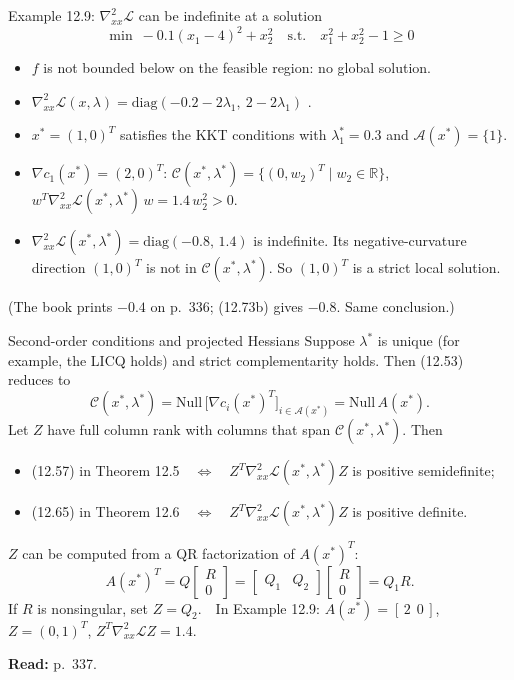 \documentclass[aspectratio=169,12pt]{beamer}
\newcommand{\R}{\mathbb{R}}
\newcommand{\xs}{x^{*}}
\newcommand{\eqn}[1]{\text{\small(#1)}}
\newcommand{\readbook}[1]{{\color{red}\textbf{Read:} #1}}
\newcommand{\ls}{\lambda^{*}}
\newcommand{\cA}{\mathcal{A}}
\newcommand{\cC}{\mathcal{C}}
\newcommand{\cL}{\mathcal{L}}
\newcommand{\hessL}{\nabla_{xx}^{2}\cL}
\begin{document}
\begin{frame}{Example 12.9: $\hessL$ can be indefinite at a solution}
  \[ \min\ -0.1(x_{1}-4)^{2}+x_{2}^{2}\quad\text{s.t.}\quad x_{1}^{2}+x_{2}^{2}-1\ge 0 \tag{12.72} \]
  \begin{itemize}\setlength\itemsep{0.5em}
    \item $f$ is not bounded below on the feasible region: no global solution.
    \item $\hessL(x,\lambda)=\mathrm{diag}(-0.2-2\lambda_{1},\ 2-2\lambda_{1})$ \eqn{12.73b}.
    \item $\xs=(1,0)^{T}$ satisfies the KKT conditions with $\ls_{1}=0.3$ and $\cA(\xs)=\{1\}$.
    \item $\nabla c_{1}(\xs)=(2,0)^{T}$: $\cC(\xs,\ls)=\{(0,w_{2})^{T}\mid w_{2}\in\R\}$,
      $w^{T}\hessL(\xs,\ls)\,w=1.4\,w_{2}^{2}>0$.
    \item $\hessL(\xs,\ls)=\mathrm{diag}(-0.8,\,1.4)$ is indefinite. Its negative-curvature direction
      $(1,0)^{T}$ is not in $\cC(\xs,\ls)$. So $(1,0)^{T}$ is a strict local solution.
  \end{itemize}
  {\small (The book prints $-0.4$ on p.~336; (12.73b) gives $-0.8$. Same conclusion.)}
\end{frame}

\begin{frame}{Second-order conditions and projected Hessians}
  Suppose $\ls$ is unique (for example, the LICQ holds) and strict complementarity holds.
  Then (12.53) reduces to
  \[ \cC(\xs,\ls)=\mathrm{Null}\,\bigl[\nabla c_{i}(\xs)^{T}\bigr]_{i\in\cA(\xs)}=\mathrm{Null}\,A(\xs) . \]
  Let $Z$ have full column rank with columns that span $\cC(\xs,\ls)$. Then
  \begin{itemize}\setlength\itemsep{0.3em}
    \item (12.57) in Theorem 12.5\ \ $\Leftrightarrow$\ \ $Z^{T}\hessL(\xs,\ls)Z$ is positive semidefinite;
    \item (12.65) in Theorem 12.6\ \ $\Leftrightarrow$\ \ $Z^{T}\hessL(\xs,\ls)Z$ is positive definite.
  \end{itemize}
  $Z$ can be computed from a QR factorization of $A(\xs)^{T}$:
  \[ A(\xs)^{T}=Q\begin{bmatrix}R\\0\end{bmatrix}
     =\begin{bmatrix}Q_{1} & Q_{2}\end{bmatrix}\begin{bmatrix}R\\0\end{bmatrix}=Q_{1}R . \tag{12.74} \]
  If $R$ is nonsingular, set $Z=Q_{2}$.\ \ In Example 12.9: $A(\xs)=[\,2\ \ 0\,]$, $Z=(0,1)^{T}$,
  $Z^{T}\hessL Z=1.4$.

  \vspace{0.3em}
  \readbook{p.~337.}
\end{frame}
\end{document}

